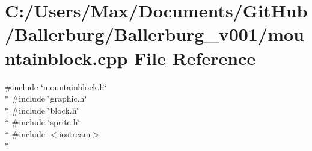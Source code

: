 \section{C\+:/\+Users/\+Max/\+Documents/\+Git\+Hub/\+Ballerburg/\+Ballerburg\+\_\+v001/mountainblock.cpp File Reference}
\label{mountainblock_8cpp}
{\ttfamily \#include \char`\"{}mountainblock.\+h\char`\"{}}\\*
{\ttfamily \#include \char`\"{}graphic.\+h\char`\"{}}\\*
{\ttfamily \#include \char`\"{}block.\+h\char`\"{}}\\*
{\ttfamily \#include \char`\"{}sprite.\+h\char`\"{}}\\*
{\ttfamily \#include $<$iostream$>$}\\*
